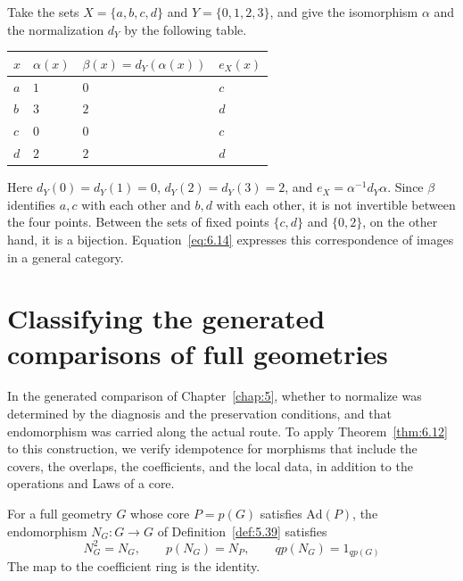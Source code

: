 \begin{example}\label{ex:6.13}

Take the sets $X=\{a,b,c,d\}$ and $Y=\{0,1,2,3\}$, and give the isomorphism $\alpha$ and
the normalization $d_Y$ by the following table.

\begin{xltabular}{\linewidth}{@{}LLLL@{}}
\toprule
$x$ & $\alpha(x)$ & $\beta(x)=d_Y(\alpha(x))$ & $e_X(x)$ \\
\midrule
\endhead
$a$ & $1$ & $0$ & $c$ \\
\addlinespace[3pt]
$b$ & $3$ & $2$ & $d$ \\
\addlinespace[3pt]
$c$ & $0$ & $0$ & $c$ \\
\addlinespace[3pt]
$d$ & $2$ & $2$ & $d$ \\
\bottomrule
\end{xltabular}

Here $d_Y(0)=d_Y(1)=0$, $d_Y(2)=d_Y(3)=2$, and
$e_X=\alpha^{-1}d_Y\alpha$.
Since $\beta$ identifies $a,c$ with each other and $b,d$ with each other, it is not
invertible between the four points.
Between the sets of fixed points $\{c,d\}$ and $\{0,2\}$, on the other hand, it is a
bijection.
Equation~\eqref{eq:6.14} expresses this correspondence of images in a general category.

\end{example}

\section{Classifying the generated comparisons of full geometries}\label{sec:6.4}

In the generated comparison of Chapter~\ref{chap:5}, whether to normalize was determined by
the diagnosis and the preservation conditions, and that endomorphism was carried along the
actual route.
To apply Theorem~\ref{thm:6.12} to this construction, we verify idempotence for morphisms
that include the covers, the overlaps, the coefficients, and the local data, in addition to
the operations and Laws of a core.

\begin{theorem}\label{thm:6.14}

For a full geometry $G$ whose core $P=p(G)$ satisfies $\mathrm{Ad}(P)$, the endomorphism
$N_G:G\to G$ of Definition~\ref{def:5.39} satisfies
\begin{equation*}
N_G^2=N_G,\qquad p(N_G)=N_P,\qquad
qp(N_G)=1_{qp(G)}
\tag{6.15}\label{eq:6.15}
\end{equation*}
The map to the coefficient ring is the identity.

\end{theorem}

